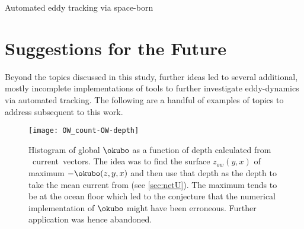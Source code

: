 Automated eddy tracking via space-born












\section{Suggestions for the Future}
Beyond the topics discussed in this study, further ideas led to several additional, mostly incomplete implementations of tools to further investigate eddy-dynamics via automated tracking. The following are a handful of examples of topics to address subsequent to this work.

\begin{figure}
	\texttt{[image: OW\_count-OW-depth]}
	\caption{Histogram of global $\okubo$ as a function of depth calculated from \POP~current~vectors. The idea was to find the surface $z_{ow}(y,x)$ of maximum $-\okubo(z,y,x)$ and then use that depth as the depth to take the mean current from (see \cref{sec:netU}). The maximum tends to be at the ocean floor which led to the conjecture that the numerical implementation of $\okubo$ might have been erroneous. Further application was hence abandoned.  }
	\label{fig:OW_count-OW-depth}
\end{figure}


